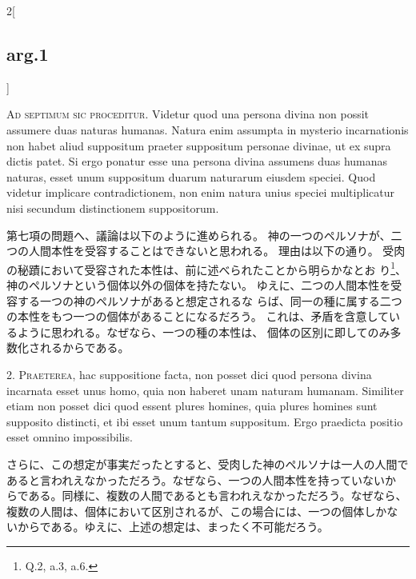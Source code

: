 \documentclass[paper=a4paper,fontsize=10pt,jafontsize=9pt,titlepage]{jlreq}
\begin{document}
\begin{paracol}{2}[\subsection{arg.1}]

{\Huge A}{\scshape d septimum sic proceditur}. Videtur quod una persona divina non possit
assumere duas naturas humanas. Natura enim assumpta in mysterio
incarnationis non habet aliud suppositum praeter suppositum personae
divinae, ut ex supra dictis patet. Si ergo ponatur esse una persona
divina assumens duas humanas naturas, esset unum suppositum duarum
naturarum eiusdem speciei. Quod videtur implicare contradictionem, non
enim natura unius speciei multiplicatur nisi secundum distinctionem
suppositorum.

\switchcolumn

第七項の問題へ、議論は以下のように進められる。
神の一つのペルソナが、二つの人間本性を受容することはできないと思われる。
 理由は以下の通り。
 受肉の秘蹟において受容された本性は、前に述べられたことから明らかなとお
 り\footnote{Q.2, a.3, a.6.}、神のペルソナという個体以外の個体を持たない。
 ゆえに、二つの人間本性を受容する一つの神のペルソナがあると想定されるな
 らば、同一の種に属する二つの本性をもつ一つの個体があることになるだろう。
 これは、矛盾を含意しているように思われる。なぜなら、一つの種の本性は、
 個体の区別に即してのみ多数化されるからである。


2. {\scshape Praeterea}, hac suppositione facta, non posset dici quod persona divina
incarnata esset unus homo, quia non haberet unam naturam
humanam. Similiter etiam non posset dici quod essent plures homines,
quia plures homines sunt supposito distincti, et ibi esset unum tantum
suppositum. Ergo praedicta positio esset omnino impossibilis.

\switchcolumn

さらに、この想定が事実だったとすると、受肉した神のペルソナは一人の人間で
 あると言われえなかっただろう。なぜなら、一つの人間本性を持っていないか
 らである。同様に、複数の人間であるとも言われえなかっただろう。なぜなら、
 複数の人間は、個体において区別されるが、この場合には、一つの個体しかな
 いからである。ゆえに、上述の想定は、まったく不可能だろう。



\end{paracol}
\end{document}
